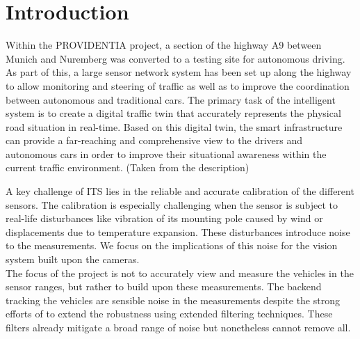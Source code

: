 
\section{Introduction}

Within the PROVIDENTIA project, a section of the highway A9 between Munich and Nuremberg was converted to a testing site for autonomous driving. 
As part of this, a large sensor network system has been set up along the highway to allow monitoring and steering of traffic as well as to improve the coordination between autonomous and traditional cars. 
The primary task of the intelligent system is to create a digital traffic twin that accurately represents the physical road situation in real-time. 
Based on this digital twin, the smart infrastructure can provide a far-reaching and comprehensive view to the drivers and autonomous cars in order to improve their situational awareness within the current traffic environment.
(Taken from the description) 




A key challenge of ITS lies in the reliable and accurate calibration of the different sensors.
The calibration is especially challenging when the sensor is subject to real-life disturbances like vibration of its mounting pole caused by wind or displacements due to temperature expansion.
These disturbances introduce noise to the measurements. We focus on the implications of this noise for the vision system built upon the cameras.
\\

The focus of the project is not to accurately view and measure the vehicles in the sensor ranges, but rather to build upon these measurements. 
The backend tracking the vehicles are sensible noise in the measurements despite the strong efforts of to extend the robustness using extended filtering techniques. 
These filters already mitigate a broad range of noise but nonetheless cannot remove all.

